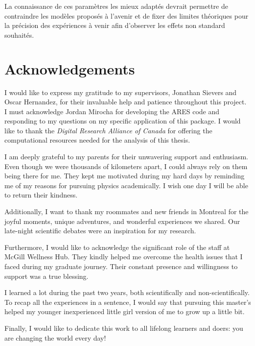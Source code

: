 \documentclass[12pt, TexShade, letterpaper]{report}
\begin{document}
La connaissance de ces paramètres les mieux adaptés devrait permettre de contraindre les modèles proposés à l'avenir et de fixer des limites théoriques pour la précision des expériences à venir afin d'observer les effets non standard souhaités.\par
\chapter*{Acknowledgements}
	\label{chap:acknowledgments}
I would like to express my gratitude to my supervisors, Jonathan Sievers and Oscar Hernandez, for their invaluable help and patience throughout this project. I must acknowledge Jordan Mirocha for developing the ARES code and responding to my questions on my specific application of this package. I would like to thank the \emph{Digital Research Alliance of Canada} for offering the computational resources needed for the analysis of this thesis.\par
I am deeply grateful to my parents for their unwavering support and enthusiasm. Even though we were thousands of kilometers apart, I could always rely on them being there for me. They kept me motivated during my hard days by reminding me of my reasons for pursuing physics academically. I wish one day I will be able to return their kindness.\par
Additionally, I want to thank my roommates and new friends in Montreal for the joyful moments, unique adventures, and wonderful experiences we shared. Our late-night scientific debates were an inspiration for my research. \par
Furthermore, I would like to acknowledge the significant role of the staff at McGill Wellness Hub. They kindly helped me overcome the health issues that I faced during my graduate journey. Their constant presence and willingness to support was a true blessing.\par
I learned a lot during the past two years, both scientifically and non-scientifically. To recap all the experiences in a sentence, I would say that pursuing this master's helped my younger inexperienced little girl version of me to grow up a little bit.\par

 Finally, I would like to dedicate this work to all lifelong learners and doers: you are changing the world every day!
	\tableofcontents\thispagestyle{plain}
 \glsunsetall
	\listoffigures\thispagestyle{plain}
 \glsresetall
 \glsunsetall
	\listoftables
  \glsresetall
	\glsaddall
	\setlength\LTleft{0pt}
	\setlength\LTright{0pt}
	\setlength\glsdescwidth{0.8\hsize}
	\printglossary[title={List of Acronyms}]
\end{document}
